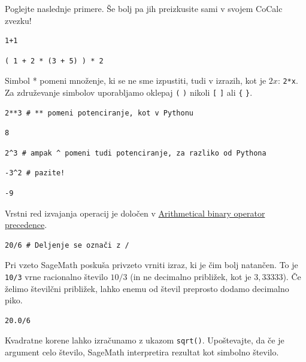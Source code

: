 Poglejte naslednje primere. Še bolj pa jih preizkusite sami v svojem CoCalc zvezku!

\begin{verbatim}
1+1
\end{verbatim}

\begin{verbatim}
( 1 + 2 * (3 + 5) ) * 2
\end{verbatim}

Simbol * pomeni množenje, ki se ne sme izpustiti, tudi v izrazih, kot je $2x$: \texttt{2*x}. Za združevanje simbolov uporabljamo oklepaj \texttt{(} \texttt{)} nikoli \texttt{[} \texttt{]} ali \texttt{\{} \texttt{\}}.

\begin{verbatim}
2**3 # ** pomeni potenciranje, kot v Pythonu
\end{verbatim}

\begin{verbatim}
8
\end{verbatim}

\begin{verbatim}
2^3 # ampak ^ pomeni tudi potenciranje, za razliko od Pythona
\end{verbatim}

\begin{verbatim}
-3^2 # pazite!
\end{verbatim}

\begin{verbatim}
-9
\end{verbatim}

Vrstni red izvajanja operacij je določen v \href{https://doc.sagemath.org/html/en/tutorial/appendix.html\#section-precedence}{Arithmetical binary operator precedence}.

\begin{verbatim}
20/6 # Deljenje se označi z /
\end{verbatim}

Pri vzeto SageMath poskuša privzeto vrniti izraz, ki je čim bolj natančen. To je \texttt{10/3} vrne racionalno število $10/3$ (in ne decimalno približek, kot je $3,33333$). Če želimo številčni približek, lahko enemu od števil preprosto dodamo decimalno piko.

\begin{verbatim}
20.0/6
\end{verbatim}

Kvadratne korene lahko izračunamo z ukazom \texttt{sqrt()}. Upoštevajte, da če je argument celo število, SageMath interpretira rezultat kot simbolno število.

